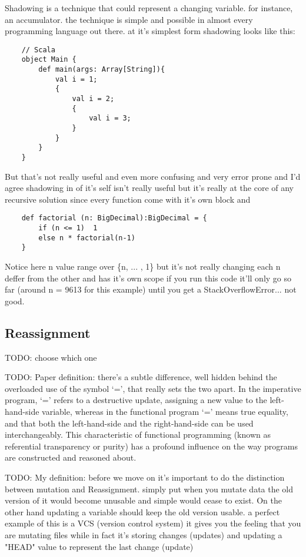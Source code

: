 \documentclass[conference]{IEEEtran}
\begin{document}
Shadowing is a technique that could represent a changing variable. for instance, an accumulator. the technique is simple and possible in almost every programming language out there.
at it's simplest form shadowing looks like this:
\begin{lstlisting}
    // Scala  
    object Main {
        def main(args: Array[String]){
            val i = 1;
            {
                val i = 2;
                {
                    val i = 3;
                }
            }
        }  
    }    
\end{lstlisting}
But that's not really useful and even more confusing and very error prone and I'd agree shadowing in of it's self isn't really useful but it's really at the core of any recursive solution since every function come with it's own block and 
\begin{lstlisting} 
    def factorial (n: BigDecimal):BigDecimal = {
        if (n <= 1)  1
        else n * factorial(n-1)
    }
\end{lstlisting}
Notice here n value range over \{n, ... , 1\} but it's not really changing each n deffer from the other and has it's own scope
if you run this code it'll only go so far (around  n = 9613 for this example) until you get a StackOverflowError... not good.

\subsection{Reassignment}
TODO: choose which one

TODO: Paper definition:
there's a subtle difference, well
hidden behind the overloaded use of the symbol
‘=’, that really sets the two apart. In the imperative
program, ‘=’ refers to a destructive update, assigning
a new value to the left-hand-side variable,
whereas in the functional program ‘=’ means true
equality, and that both the left-hand-side and the right-hand-side can be used interchangeably. This characteristic
of functional programming (known as referential
transparency or purity) has a profound influence
on the way programs are constructed and reasoned
about.

TODO: My definition:
before we move on it's important to do the distinction between mutation and Reassignment. simply put when you mutate data the old version of it would become unusable and simple would cease to exist. On the other hand updating a variable should keep the old version usable. a perfect example of this is a VCS (version control system) it gives you the feeling that you are mutating files while in fact it's storing changes (updates) and updating a "HEAD" value to represent the last change (update)
\end{document}
